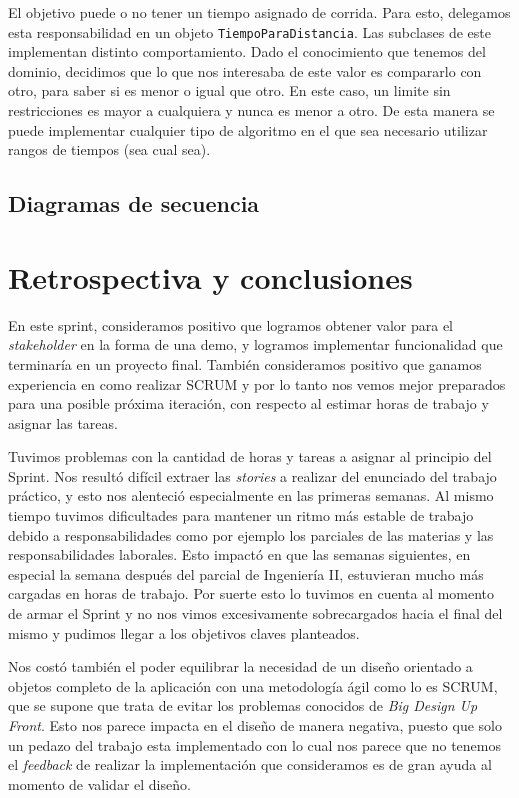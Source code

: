 \documentclass[10pt, a4paper,english,spanish]{article}
\begin{document}
El objetivo puede o no tener un tiempo asignado de corrida. Para esto, delegamos esta responsabilidad en un objeto \texttt{TiempoParaDistancia}. Las subclases de este implementan distinto comportamiento. Dado el conocimiento que tenemos del dominio, decidimos que lo que nos interesaba de este valor es compararlo con otro, para saber si es menor o igual que otro. En este caso, un limite sin restricciones es mayor a cualquiera y nunca es menor a otro. De esta manera se puede implementar cualquier tipo de algoritmo en el que sea necesario utilizar rangos de tiempos (sea cual sea).

\subsection{Diagramas de secuencia}



\section{Retrospectiva y conclusiones} 

En este sprint, consideramos positivo que logramos obtener valor para el \textit{stakeholder} en la forma de una demo, y logramos implementar funcionalidad que
terminaría en un proyecto final. También consideramos positivo que ganamos experiencia en como realizar SCRUM y por lo tanto nos vemos mejor preparados para una posible próxima iteración, con respecto al estimar horas de trabajo y asignar las tareas.

Tuvimos problemas con la cantidad de horas y tareas a asignar al principio del Sprint. Nos resultó difícil extraer las \textit{stories} a realizar del enunciado del trabajo práctico, y esto nos alenteció especialmente en las primeras semanas. Al mismo tiempo tuvimos dificultades para mantener un ritmo más estable de trabajo debido a responsabilidades como por ejemplo los parciales de las materias y las responsabilidades laborales. Esto impactó en que las semanas siguientes, en especial la semana después del parcial de Ingeniería II, estuvieran mucho más cargadas en horas de trabajo. Por suerte esto lo tuvimos en cuenta al momento de armar el Sprint y no nos vimos excesivamente sobrecargados hacia el final del mismo y pudimos llegar a los objetivos claves planteados.

Nos costó también el poder equilibrar la necesidad de un diseño orientado a objetos completo de la aplicación con una metodología ágil como lo es SCRUM, que se supone que trata de evitar los problemas conocidos de \textit{Big Design Up Front}. Esto nos parece impacta en el diseño de manera negativa, puesto que solo un pedazo del trabajo esta implementado con lo cual nos parece que no tenemos el \textit{feedback} de realizar la implementación que consideramos es de gran ayuda al momento de validar el diseño.
\end{document}

